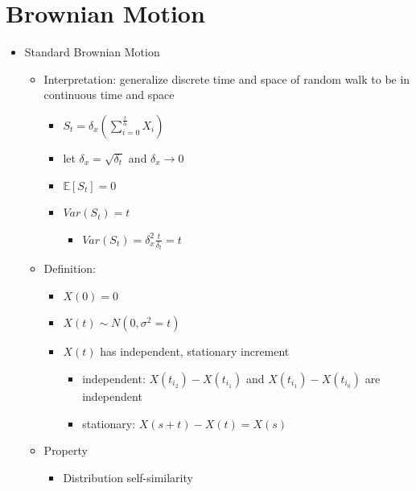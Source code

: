 \documentclass[a4paper]{article}
\begin{document}
\section{Brownian Motion}
\begin{itemize}
    \item Standard Brownian Motion
        \begin{itemize}
            \item Interpretation: generalize discrete time and space of random walk to be in continuous time and space
                \begin{itemize}
                    \item $S_t = \delta_x (\sum_{i=0}^{\frac{t}{\delta_t}} X_i)$
                    \item let $\delta_x = \sqrt{\delta_t}$ and $\delta_x \rightarrow 0$
                    \item $\mathbb{E}[S_t] = 0$
                    \item $\mathit{Var}(S_t) = t$
                        \begin{itemize}
                            \item $\mathit{Var}(S_t) = \delta_x^2 \frac{t}{\delta_t} = t$
                        \end{itemize}
                \end{itemize}
            \item Definition:
                \begin{itemize}
                    \item $X(0) = 0$
                    \item $X(t) \sim N(0, \sigma^2 = t)$
                    \item $X(t)$ has independent, stationary increment
                        \begin{itemize}
                            \item independent: $X(t_{i_2}) - X(t_{i_1})$ and $X(t_{i_1}) - X(t_{i_0})$ are independent
                            \item stationary: $X(s + t) - X(t) = X(s)$
                        \end{itemize}
                \end{itemize}
            \item Property
                \begin{itemize}
                    \item Distribution self-similarity
                        \begin{itemize}

\end{itemize}
\end{itemize}
\end{itemize}
\end{itemize}
\end{document}
